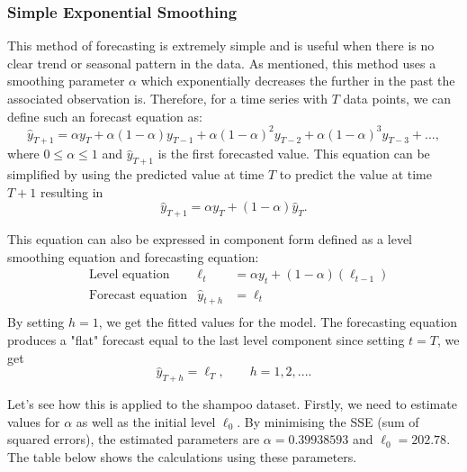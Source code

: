 \documentclass{article}
\begin{document}
  \subsubsection{Simple Exponential Smoothing}
  This method of forecasting is extremely simple and is useful when there is no clear trend or seasonal pattern in the data. As mentioned, this method uses a smoothing parameter $\alpha$ which exponentially decreases the further in the past the associated observation is. Therefore, for a time series with $T$ data points, we can define such an forecast equation as:
  \begin{equation*}
    \hat{y}_{T+1} = \alpha y_T + \alpha(1-\alpha)y_{T-1} + \alpha(1-\alpha)^2y_{T-2} + \alpha(1-\alpha)^3y_{T-3} + ...,
  \end{equation*}
  where $0 \le \alpha \le 1$ and $\hat{y}_{T+1}$ is the first forecasted value. This equation can be simplified by using the predicted value at time $T$ to predict the value at time $T+1$ resulting in
  \begin{equation*}
    \hat{y}_{T+1} = \alpha y_T + (1-\alpha)\hat{y}_{T}.
  \end{equation*}

  This equation can also be expressed in component form defined as a level smoothing equation and forecasting equation:
  \begin{align*}
    & \text{Level equation} & \ell_t &= \alpha y_t + (1-\alpha)(\ell_{t-1})  \\
    & \text{Forecast equation} & \hat{y}_{t+h} &= \ell_t \\
  \end{align*}
  By setting $h=1$, we get the fitted values for the model. The forecasting equation produces a "flat" forecast equal to the last level component since setting $t=T$, we get
  \begin{equation*}
    \hat{y}_{T+h} = \ell_T, \qquad h=1,2,....
  \end{equation*}
  
  Let's see how this is applied to the shampoo dataset. Firstly, we need to estimate values for $\alpha$ as well as the initial level $\ell_0$. By minimising the SSE (sum of squared errors), the estimated parameters are $\alpha=0.39938593$ and $\ell_0=202.78$. The table below shows the calculations using these parameters.
\end{document}
